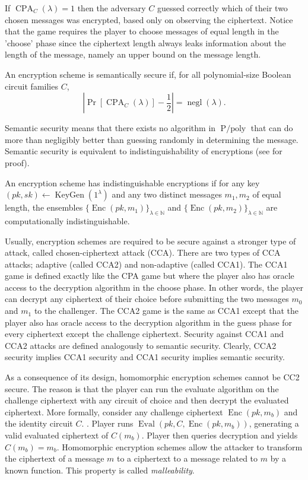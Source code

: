 If $\operatorname{CPA}_{C}(\lambda) = 1$ then the adversary $C$ guessed correctly which of their two chosen messages was encrypted, based only on observing the ciphertext. Notice that the game requires the player to choose messages of equal length in the 'choose' phase since the ciphertext length always leaks information about the length of the message, namely an upper bound on the message length.
\begin{definition}
    An encryption scheme is semantically secure if, for all polynomial-size Boolean circuit families $C$, $$| \operatorname{Pr}[\operatorname{CPA}_{C}(\lambda)] - \frac{1}{2} | = \operatorname{negl}(\lambda).$$
\end{definition}
Semantic security means that there exists no algorithm in $\operatorname{P/poly}$ that can do more than negligibly better than guessing randomly in determining the message. Semantic security is equivalent to indistinguishability of encryptions (see \cite{Gol04} for proof).

\begin{definition}
    An encryption scheme has indistinguishable encryptions if for any key $(pk,sk) \leftarrow \operatorname{KeyGen}(1^{\lambda})$ and any two distinct messages $m_1, m_2$ of equal length, the ensembles $\{\operatorname{Enc}(pk,m_1)\}_{\lambda \in \mathbb{N}}$ and $\{\operatorname{Enc}(pk,m_2)\}_{\lambda \in \mathbb{N}}$ are computationally indistinguishable.
\end{definition}

Usually, encryption schemes are required to be secure against a stronger type of attack, called chosen-ciphertext attack (CCA). There are two types of CCA attacks; adaptive (called CCA2) and non-adaptive (called CCA1). The CCA1 game is defined exactly like the CPA game but where the player also has oracle access to the decryption algorithm in the choose phase. In other words, the player can decrypt any ciphertext of their choice before submitting the two messages $m_0$ and $m_1$ to the challenger. The CCA2 game is the same as CCA1 except that the player also has oracle access to the decryption algorithm in the guess phase for every ciphertext except the challenge ciphertext. Security against CCA1 and CCA2 attacks are defined analogously to semantic security. Clearly, CCA2 security implies CCA1 security and CCA1 security implies semantic security.

As a consequence of its design, homomorphic encryption schemes cannot be CC2 secure. The reason is that the player can run the evaluate algorithm on the challenge ciphertext with any circuit of choice and then decrypt the evaluated ciphertext. More formally, consider any challenge ciphertext $\operatorname{Enc}(pk,m_b)$ and the identity circuit $C$. . Player runs $\operatorname{Eval}(pk,C,\operatorname{Enc}(pk,m_b))$, generating a valid evaluated ciphertext of $C(m_b)$. Player then queries decryption and yields $C(m_b) = m_b$. Homomorphic encryption schemes allow the attacker to transform the ciphertext of a message $m$ to a ciphertext to a message related to $m$ by a known function. This property is called \textit{malleability}.

